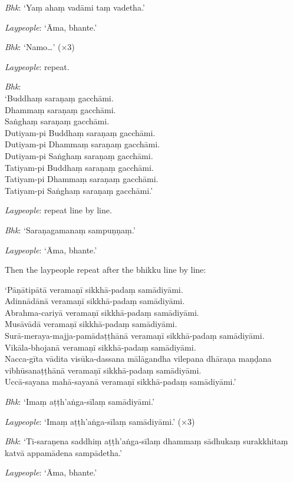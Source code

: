 \emph{Bhk}: ‘Yaṃ ahaṃ vadāmi taṃ vadetha.’

\emph{Laypeople}: ‘Āma, bhante.’

\emph{Bhk}: ‘Namo…’ (×3)

\emph{Laypeople}: repeat.

\emph{Bhk}:\\
‘Buddhaṃ saraṇaṃ gacchāmi.\\
Dhammaṃ saraṇaṃ gacchāmi.\\
Saṅghaṃ saraṇaṃ gacchāmi.\\
Dutiyam-pi Buddhaṃ saraṇaṃ gacchāmi.\\
Dutiyam-pi Dhammaṃ saraṇaṃ gacchāmi.\\
Dutiyam-pi Saṅghaṃ saraṇaṃ gacchāmi.\\
Tatiyam-pi Buddhaṃ saraṇaṃ gacchāmi.\\
Tatiyam-pi Dhammaṃ saraṇaṃ gacchāmi.\\
Tatiyam-pi Saṅghaṃ saraṇaṃ gacchāmi.’

\emph{Laypeople}: repeat line by line.

\emph{Bhk}: ‘Saraṇagamanaṃ sampuṇṇaṃ.’

\emph{Laypeople}: ‘Āma, bhante.’

Then the laypeople repeat after the bhikku line by line:

‘Pāṇātipātā veramaṇī sikkhā-padaṃ samādiyāmi.\\
Adinnādānā veramaṇī sikkhā-padaṃ samādiyāmi.\\
Abrahma-cariyā veramaṇī sikkhā-padaṃ samādiyāmi.\\
Musāvādā veramaṇī sikkhā-padaṃ samādiyāmi.\\
Surā-meraya-majja-pamādaṭṭhānā veramaṇī sikkhā-padaṃ samādiyāmi.\\
Vikāla-bhojanā veramaṇī sikkhā-padaṃ samādiyāmi.\\
Nacca-gīta vādita visūka-dassana mālāgandha vilepana dhāraṇa maṇḍana
vibhūsanaṭṭhānā veramaṇī sikkhā-padaṃ samādiyāmi.\\
Uccā-sayana mahā-sayanā veramaṇī sikkhā-padaṃ samādiyāmi.’


\emph{Bhk}: ‘Imaṃ aṭṭh'aṅga-sīlaṃ samādiyāmi.’

\emph{Laypeople}: ‘Imaṃ aṭṭh'aṅga-sīlaṃ samādiyāmi.’ (×3)

\emph{Bhk}: ‘Ti-saraṇena saddhiṃ aṭṭh'aṅga-sīlaṃ dhammaṃ sādhukaṃ surakkhitaṃ
katvā appamādena sampādetha.’

\emph{Laypeople}: ‘Āma, bhante.’


